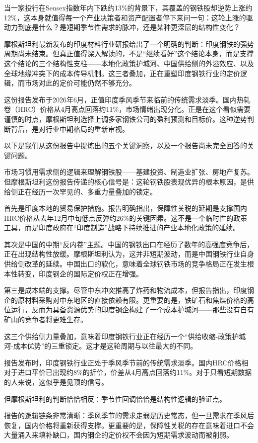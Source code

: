 \documentclass[11pt]{ctexart}
\begin{document}
当一家投行在Sensex指数年内下跌约13\%的背景下，其覆盖的钢铁股却逆势上涨约12\%，这本身就值得每一个产业决策者和资产配置者停下来问一句：这轮上涨的驱动力到底是什么？是短期季节性需求的脉冲，还是某种更深层的结构性变化？

摩根斯坦利最新发布的印度材料行业研报给出了一个明确的判断：印度钢铁的强势周期尚未结束。但真正值得深入解读的，不是“继续看好”这个结论本身，而是支撑这个结论的三个结构性支柱——本地化政策护城河、中国供给侧的外溢效应、以及全球地缘冲突下的成本传导机制。这三者叠加，正在重塑印度钢铁行业的定价逻辑，而市场对此的定价可能仍然不够充分。

这份报告发布于2026年6月，正值印度季风季节来临前的传统需求淡季。国内热轧卷（HRC）价格从4月高点回落约11\%，市场情绪出现分化。正是在这个看似需要谨慎的时点，摩根斯坦利选择上调多家钢铁公司的盈利预测和目标价。这种逆势判断背后，是对行业中期格局的重新审视。

以下是我们从这份报告中提炼出的五个关键洞察，以及一个报告尚未完全回答的关键问题。

市场习惯用需求侧的逻辑来理解钢铁股——基建投资、制造业扩张、房地产复苏。但摩根斯坦利这份报告传递的核心信号是：这轮钢铁股表现优异的根本原因，是供给侧正在经历一次罕见的、多重力量叠加的锁定。

首先是印度本地的贸易保护措施。报告明确指出，保障性关税的延期是支撑国内HRC价格从去年12月中旬低点反弹约26\%的关键因素。这不是一个临时性的政策工具，而是印度政府在“印度制造”战略下持续推进的产业本地化政策的延续。

其次是中国的中期“反内卷”主题。中国的钢铁出口在经历了数年的高强度竞争后，正在出现结构性放缓。摩根斯坦利认为，这并非短期波动，而是中国钢铁行业自身供给侧改革的延续。中国出口的软化，意味着全球钢铁市场的竞争格局正在发生根本性转变，印度钢企的国际定价权正在增强。

第三是成本端的支撑。尽管中东冲突推高了炸药和物流成本，但报告指出，印度钢企的原材料采购对中东地区的直接依赖有限。更重要的是，铁矿石和焦煤价格的高位运行，反而为具备资源优势的印度钢企构建了一个成本护城河——那些没有自有矿山的竞争者将更难生存。

这三个供给侧力量叠加，意味着印度钢铁行业正在经历一个“供给收缩-政策护城河-成本优势”的三重锁定。这才是这轮周期与以往最大的不同。

报告发布时，印度钢铁行业正处于季风季节前的传统需求淡季。国内HRC价格相对于进口平价已出现约8\%的折价，价差从4月高点回落约11\%。对于只看短期数据的人来说，这似乎是见顶的信号。

但摩根斯坦利的判断恰恰相反：季节性回调恰恰是结构性逻辑的验证点。

报告的逻辑链条非常清晰：季风季节的需求走弱是历史常态，但一旦需求在季风后恢复，国内价格将重新获得支撑。更重要的是，保障性关税的存在意味着进口不会大量涌入来填补缺口，国内钢企的定价权不会因为短期需求波动而被削弱。
\end{document}
